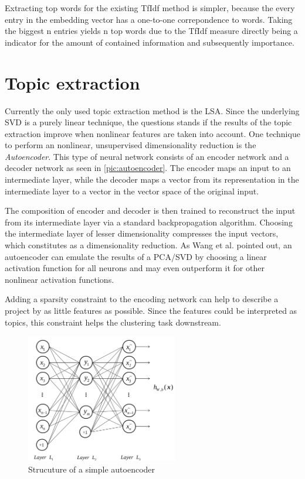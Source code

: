 Extracting top words for the existing TfIdf method is simpler, because the every entry in the embedding vector has a one-to-one correpondence to words. Taking the biggest n entries yields n top words due to the TfIdf measure directly being a indicator for the amount of contained information and subsequently importance.

\section{Topic extraction}

Currently the only used topic extraction method is the LSA. Since the underlying SVD is a purely linear technique, the questions stands if the results of the topic extraction improve when nonlinear features are taken into account. One technique to perform an nonlinear, unsupervised dimensionality reduction is the \textit{Autoencoder}. This type of neural network consists of an encoder network and a decoder network as seen in \autoref{pic:autoencoder}. The encoder maps an input to an intermediate layer, while the decoder maps a vector from its representation in the intermediate layer to a vector in the vector space of the original input.

The composition of encoder and decoder is then trained to reconstruct the input from its intermediate layer via a standard backpropagation algorithm. Choosing the intermediate layer of lesser dimensionality compresses the input vectors, which constitutes as a dimensionality reduction. As Wang et al. \cite{wangAutoencoderBasedDimensionality2016} pointed out, an autoencoder can emulate the results of a PCA/SVD by choosing a linear activation function for all neurons and may even outperform it for other nonlinear activation functions.

Adding a sparsity constraint to the encoding network can help to describe a project by as little features as possible. Since the features could be interpreted as topics, this constraint helps the clustering task downstream.

\begin{figure}[t]
	\centering
	\includegraphics[width=250px]{../chapters/implementation/pics/autoencoder}
	\caption{\label{pic:autoencoder} Strucuture of a simple autoencoder {\cite{wangAutoencoderBasedDimensionality2016}}}
\end{figure} 

